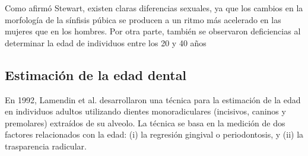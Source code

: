\documentclass[a4paper,11pt]{article}
\begin{document}
Como afirmó Stewart, existen claras diferencias sexuales, ya que los cambios en la morfología de la sínfisis púbica se producen a un ritmo más acelerado en las mujeres que en los hombres. Por otra parte, también se observaron deficiencias al determinar la edad de individuos entre los 20 y 40 años \cite{hanihara1978estimation, suchey1979problems}
\subsection{Estimación de la edad dental}
En 1992, Lamendin et al. desarrollaron una técnica para la estimación de la edad en individuos adultos utilizando dientes monoradiculares (incisivos, caninos y premolares) extraídos de su alveolo. La técnica se basa en la medición de dos factores relacionados con la edad: (i) la regresión gingival o periodontosis, y (ii) la trasparencia radicular.
\end{document}

